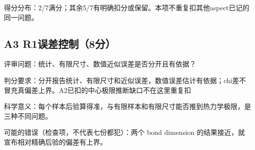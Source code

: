\documentclass[11pt,a4paper]{article}
\begin{document}
得分分布：2/7满分；其余5/7有明确扣分或保留。本项不重复扣其他aspect已记的同一问题。

\clearpage
\subsection{A3 R1误差控制（8分）}
\label{aspect:A3}
评审问题：统计、有限尺寸、数值近似误差是否分开且有依据？

判分要求：分开报告统计、有限尺寸和近似误差，数值误差估计有依据；chi差不冒充真偏差上界。A2已扣的中心极限推断缺口不在这里重复扣

科学意义：每个样本后验算得准，与有限样本和有限尺寸能否推到热力学极限，是三种不同问题。

可能的错误（检查项，不代表七份都犯）：两个 bond dimension 的结果接近，就宣布相对精确后验的偏差有上界。
\end{document}
